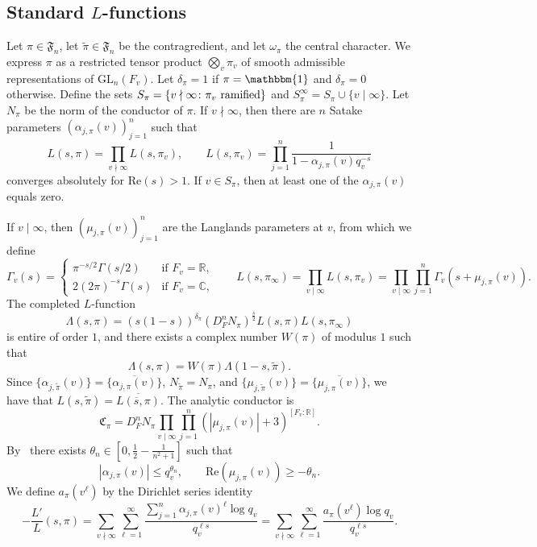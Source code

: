 \documentclass[11pt]{amsart}
\theoremstyle{remark}
\renewcommand{\tilde}{\widetilde}
\numberwithin{equation}{section}
\begin{document}
\subsection{Standard $L$-functions}
\label{subsec:standard}

Let $\pi\in\mathfrak{F}_{n}$, let $\widetilde{\pi}\in\mathfrak{F}_{n}$ be the contragredient, and let $\omega_{\pi}$ the central character.  We express $\pi$ as a restricted tensor product $\bigotimes_v \pi_v$ of smooth admissible representations of $\mathrm{GL}_n(F_v)$.  Let $\delta_{\pi}=1$ if $\pi=\mathbbm{1}$ and $\delta_{\pi}=0$ otherwise.  Define the sets $S_{\pi}=\{v\nmid\infty\colon \textup{$\pi_v$ ramified}\}$ and $S_{\pi}^{\infty}=S_{\pi}\cup\{v\mid\infty\}$.  Let $N_{\pi}$ be the norm of the conductor of $\pi$.  If $v\nmid\infty$, then there are $n$ Satake parameters $(\alpha_{j,\pi}(v))_{j=1}^n$ such that
	\[
	L(s,\pi)=\prod_{v\nmid\infty}L(s,\pi_{v}),\qquad L(s,\pi_{v}) = \prod_{j=1}^{n}\frac{1}{1-\alpha_{j,\pi}(v)q_v^{-s}}
	\]
	converges absolutely for $\mathrm{Re}(s)>1$.  If $v\in S_{\pi}$, then at least one of the $\alpha_{j,\pi}(v)$ equals zero.
	
If $v\mid\infty$, then $(\mu_{j,\pi}(v))_{j=1}^n$ are the Langlands parameters at $v$, from which we define
\[
\Gamma_v(s)=\begin{cases}
	\pi^{-s/2}\Gamma(s/2)&\mbox{if $F_v=\mathbb{R}$,}\\
	2(2\pi)^{-s}\Gamma(s)&\mbox{if $F_v=\mathbb{C}$,}
	\end{cases}\qquad L(s,\pi_{\infty}) = \prod_{v\mid\infty}L(s,\pi_v) = \prod_{v\mid\infty}\prod_{j=1}^n \Gamma_v(s+\mu_{j,\pi}(v)).
	\]
	The completed $L$-function
	\[
	\Lambda(s,\pi)=(s(1-s))^{\delta_{\pi}}(D_F^n N_{\pi})^{\frac{s}{2}}L(s,\pi)L(s,\pi_{\infty})
	\]
	is entire of order $1$, and there exists a complex number $W(\pi)$ of modulus $1$ such that
	\[
	\Lambda(s,\pi)=W(\pi)\Lambda(1-s,\tilde{\pi}).
	\]
	Since $\{\alpha_{j,\widetilde{\pi}}(v)\}=\{\overline{\alpha_{j,\pi}(v)}\}$, $N_{\widetilde{\pi}}=N_{\pi}$, and $\{\mu_{j,\widetilde{\pi}}(v)\}=\{\overline{\mu_{j,\pi}(v)}\}$, we have that $L(s,\widetilde{\pi})=\overline{L(\overline{s},\pi)}$.  The analytic conductor is
\begin{equation}
\label{eqn:AC_def}
\mathfrak{C}_{\pi}=D_F^n N_{\pi} \prod_{v\mid\infty}\prod_{j=1}^n (|\mu_{j,\pi}(v)|+3)^{[F_v:\mathbb{R}]}.
\end{equation}
By~\cite{LRS,MullerSpeh} there exists $\theta_n\in[0,\frac{1}{2}-\frac{1}{n^2+1}]$ such that
\begin{equation}
\label{eqn:Ramanujan1}
|\alpha_{j,\pi}(v)|\leq q_v^{\theta_{n}},\qquad \mathrm{Re}(\mu_{j,\pi}(v))\geq -\theta_{n}.
\end{equation}
We define $a_{\pi}(v^{\ell})$ by the Dirichlet series identity
\[
-\frac{L'}{L}(s,\pi)=\sum_{v \nmid\infty}\sum_{\ell=1}^{\infty}\frac{\sum_{j=1}^n \alpha_{j,\pi}(v)^{\ell}\log q_v}{q_v^{\ell s}}=\sum_{v\nmid\infty}\sum_{\ell=1}^{\infty}\frac{a_{\pi}(v^{\ell})\log q_v}{q_v^{\ell s}}.
\]
\end{document}
